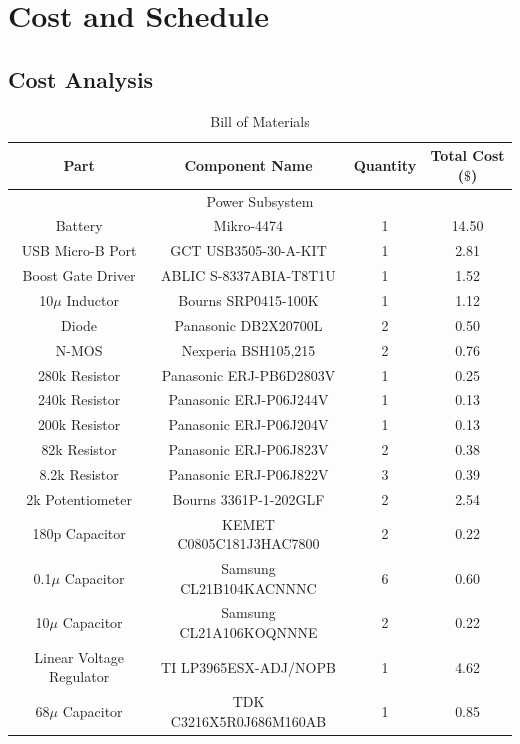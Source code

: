 \documentclass[12pt]{article}
\begin{document}
\section{Cost and Schedule}

\subsection{Cost Analysis}

\begin{table}[!h]
	\caption{Bill of Materials}
	\label{tab:block_comps}
	\centering
	{\small
	\begin{tabular}{ |c|c|c|c| } 
 		\hline
 		\textbf{Part} & \textbf{Component Name} & \textbf{Quantity} & \textbf{Total Cost} ($\$$) \\
 		\hline
 		\hline
 		\multicolumn{4}{|c|}{Power Subsystem} \\
 		\hline
 		Battery & Mikro-4474 & 1 & 14.50 \\
 		USB Micro-B Port & GCT USB3505-30-A-KIT & 1 & 2.81 \\
 		Boost Gate Driver & ABLIC S-8337ABIA-T8T1U & 1 & 1.52 \\
 		10$\mu$ Inductor & Bourns SRP0415-100K & 1 & 1.12 \\
 		Diode & Panasonic DB2X20700L & 2 & 0.50 \\
 		N-MOS & Nexperia BSH105,215 & 2 & 0.76 \\
 		280k Resistor & Panasonic ERJ-PB6D2803V & 1 & 0.25 \\
 		240k Resistor & Panasonic ERJ-P06J244V & 1 & 0.13 \\
 		200k Resistor & Panasonic ERJ-P06J204V & 1 & 0.13 \\
 		82k Resistor & Panasonic ERJ-P06J823V & 2 & 0.38 \\
 		8.2k Resistor & Panasonic ERJ-P06J822V & 3 & 0.39 \\
 		2k Potentiometer & Bourns 3361P-1-202GLF & 2 & 2.54 \\
 		180p Capacitor & KEMET C0805C181J3HAC7800 & 2 & 0.22 \\
 		0.1$\mu$ Capacitor & Samsung CL21B104KACNNNC & 6 & 0.60 \\
 		10$\mu$ Capacitor & Samsung CL21A106KOQNNNE & 2 & 0.22 \\
 		Linear Voltage Regulator & TI LP3965ESX-ADJ/NOPB & 1 & 4.62 \\
 		68$\mu$ Capacitor & TDK C3216X5R0J686M160AB & 1 & 0.85 \\

\end{tabular}}
\end{table}
\end{document}
